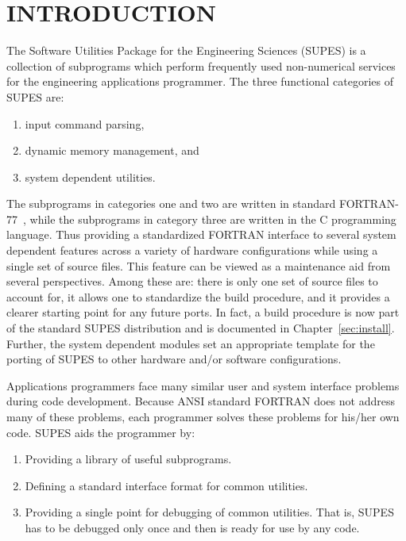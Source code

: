 \chapter{INTRODUCTION}
The Software Utilities Package for the Engineering
Sciences (SUPES) is a collection of subprograms which perform frequently
used non-numerical services for the engineering applications programmer.
The
three functional categories of SUPES are:

\begin{enumerate}

\item input command parsing,

\item dynamic memory management, and

\item system dependent utilities.

\end{enumerate}

The subprograms in categories one and two are written in standard
FORTRAN-77~\cite{ansi}, while the subprograms in category three are
written in the C programming language.  Thus providing a standardized
FORTRAN interface to several system dependent features across a
variety of hardware configurations while using a single set of source
files.  This feature can be viewed as a maintenance aid from several
perspectives.  Among these are: there is only one set of source files
to account for, it allows one to standardize the build procedure, and
it provides a clearer starting point for any future ports.  In fact, a
build procedure is now part of the standard SUPES distribution and is
documented in Chapter~\ref{sec:install}.  Further, the system
dependent modules set an appropriate template for the porting of SUPES
to other hardware and/or software configurations.

Applications programmers face many similar user and system interface problems
during code development.  Because ANSI standard FORTRAN does not address many of
these problems, each programmer solves these problems for his/her own code.
SUPES aids the programmer by:
\begin{enumerate}

\item Providing a library of useful subprograms.

\item Defining a standard interface format for common utilities.

\item Providing a single point for debugging of common utilities.  That
is, SUPES has to be debugged only once and then is ready for use
by any code.
\end{enumerate}

